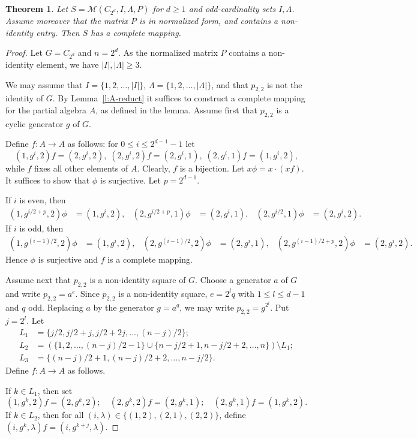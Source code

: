 \documentclass[11pt]{article}
\theoremstyle{plain}
\newtheorem{theorem}{Theorem}[section]
\theoremstyle{remark}
\theoremstyle{definition}
\theoremstyle{plain}
\begin{document}
\begin{theorem}\label{t:nonidentity}
Let $S=\mathcal{M}(C_{2^d},I,\Lambda,P)$ for $d\ge 1$ and odd-cardinality sets $I,\Lambda$. Assume moreover that the matrix $P$ is in normalized form, and contains a non-identity entry. Then $S$ has a complete mapping.
\end{theorem}
\begin{proof}
Let $G=C_{2^d}$ and $n=2^d$. As the normalized matrix $P$ contains a non-identity element, we have $|I|,|\Lambda|\ge3$.

We may assume that $I=\{1,2,\dots,|I|\}$, $\Lambda=\{1,2,\dots,|\Lambda|\}$, and that $p_{2,2}$ is not the identity of $G$. By Lemma~\ref{l:A-reduct} it suffices to construct a complete mapping for the partial algebra $A$, as defined in the lemma. Assume first that $p_{2,2}$ is a cyclic generator $g$ of $G$.

Define $f\colon A\to A$ as follows: for $0 \le i\le 2^{d-1}-1$ let
\[
(1,g^i,2)f=(2,g^i,2),\; (2,g^i,2)f=(2,g^i,1),\; (2,g^i,1)f=(1,g^i,2),
\]
while $f$ fixes all other elements of $A$. Clearly, $f$ is a bijection. Let $x\phi=x\cdot (xf)$. It suffices to show that $\phi$ is surjective. Let $p=2^{d-1}$.

If $i$ is even, then
\[
\begin{aligned}
(1,g^{i/2+p},2)\phi&=(1,g^i,2), &
(2,g^{i/2+p},1)\phi&=(2,g^i,1), &
(2,g^{i/2},1)\phi&=(2,g^i,2).
\end{aligned}
\]
If $i$ is odd, then
\[
\begin{aligned}
(1,g^{(i-1)/2},2)\phi&=(1,g^i,2), &
(2,g^{(i-1)/2},2)\phi&=(2,g^i,1), &
(2,g^{(i-1)/2+p},2)\phi&=(2,g^i,2).
\end{aligned}
\]
Hence $\phi$ is surjective and $f$ is a complete mapping.

Assume next that $p_{2,2}$ is a non-identity square of $G$. {Choose a generator $a$ of $G$ and write $p_{2,2}=a^e$. Since $p_{2,2}$ is a non-identity square, $e=2^l q$ with $1\le l\le d-1$ and $q$ odd. Replacing $a$ by the generator $g=a^q$, we may write $p_{2,2}=g^{2^l}$. Put $j=2^l$.} Let
\begin{align*}
L_1 &= \{j/2, j/2+j, j/2+2j, \dots, (n-j)/2\}; \\
L_2 &= \left(\{1,2,\dots,(n-j)/2-1\} \cup \{n-j/2+1,n-j/2+2, \dots, n\}\right) \setminus L_1; \\
L_3 &= \{ (n-j)/2+1, (n-j)/2+2, \dots, n-j/2\}.
\end{align*}
Define $f\colon A\to A$ as follows.

If $k\in L_1$, then set
\[
(1,g^k,2)f=(2,g^k,2); \quad (2,g^k,2)f=(2,g^k,1); \quad (2,g^k,1)f=(1,g^k,2).
\]
If $k\in L_2$, then for all $(i,\lambda)\in \{(1,2),(2,1),(2,2)\}$, define $(i,g^k,\lambda)f= (i, g^{k+j}, \lambda)$.


\end{proof}
\end{document}
